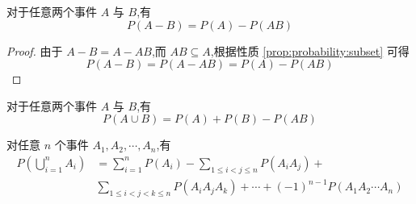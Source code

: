 \begin{property}
    \indent 对于任意两个事件 $A$ 与 $B$,有
    \begin{equation}
        P(A-B)=P(A)-P(AB)
    \end{equation}
\end{property}

\begin{proof}
    由于 $A-B=A-AB$,而 $AB \subseteq A$,根据性质 \ref{prop:probability:subset} 可得
    \[
    P(A-B)=P(A-AB)=P(A)-P(AB)
    \]

    \vspace{-2em}
\end{proof}

\begin{property}
    \indent 对于任意两个事件 $A$ 与 $B$,有
    \begin{equation} \label{equation:add}
        P(A \cup B) = P(A) + P(B) - P(AB)
    \end{equation}

    对任意 $n$ 个事件 $A_1,A_2,\cdots,A_n$,有
    \begin{equation} \label{equation:normal add}
        \begin{aligned}
            P \left( \bigcup_{i=1}^n A_i \right) &= \sum_{i=1}^n P(A_i) - \sum_{1 \leqslant i<j \leqslant n} P(A_i A_j) + \\
            & \sum_{1 \leqslant i<j<k \leqslant n} P(A_i A_j A_k) + \cdots + (-1)^{n-1} P(A_1 A_2 \cdots A_n)
        \end{aligned}
    \end{equation}
\end{property}

